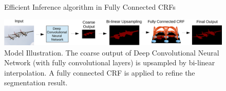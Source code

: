 \begin{figure}[t]
\caption{Efficient Inference algorithm in Fully Connected CRFs
}
\label{fig:InferenceCRF}
\end{figure}



\begin{figure}
  \centering
  \includegraphics[width=1\linewidth]{fig/model_illustration.pdf}
  \caption{Model Illustration. The coarse output of Deep Convolutional Neural Network (with fully convolutional layers) is upsampled by bi-linear interpolation. A fully connected CRF is applied to refine the segmentation result.}
  \label{fig:ModelIllustration}
\end{figure}




 


